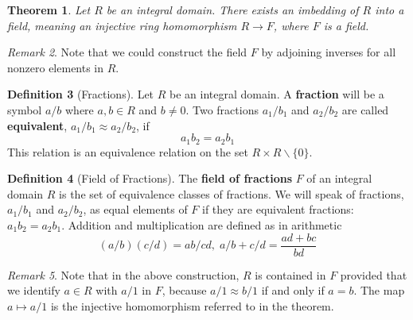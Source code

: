 \documentclass[12pt]{article}
\newtheorem{thm}{Theorem}[section]
\theoremstyle{definition}
\newtheorem{defn}[thm]{Definition}
\theoremstyle{remark}
\newtheorem{rmk}[thm]{Remark}
\numberwithin{equation}{section}
\newcommand\B[1]{\textbf{ #1}}
\begin{document}
\vspace{15pt}


\begin{thm}
        Let $R$ be an integral domain. There exists an imbedding of $R$ into a field, meaning an injective ring homomorphism $R\rightarrow F$, where $F$ is a field.
\end{thm}

\vspace{15pt}


\begin{rmk}
        Note that we could construct the field $F$ by adjoining inverses for all nonzero elements in $R$.
\end{rmk}

\vspace{15pt}

\begin{defn}[Fractions]
        Let $R$ be an integral domain. A \B{fraction} will be a symbol $a/b$ where $a,b \in R$ and $b \neq 0$. Two fractions $a_1/b_1$ and $a_2/b_2$ are called \B{equivalent}, $a_1/b_1 \approx a_2/b_2$, if \begin{equation}
                a_1b_2 = a_2b_1
        \end{equation}
        This relation is an equivalence relation on the set $R\times R\backslash\{0\}$. 
\end{defn}

\vspace{15pt}

\begin{defn}[Field of Fractions]
        The \B{field of fractions} $F$ of an integral domain $R$ is the set of equivalence classes of fractions. We will speak of fractions, $a_1/b_1$ and $a_2/b_2$, as equal elements of $F$ if they are equivalent fractions: $a_1b_2 = a_2b_1$. Addition and multiplication are defined as in arithmetic \begin{equation}
                (a/b)(c/d) = ab/cd,\;a/b+c/d = \frac{ad+bc}{bd}
        \end{equation}
\end{defn}

\vspace{15pt}

\begin{rmk}
        Note that in the above construction, $R$ is contained in $F$ provided that we identify $a \in R$ with $a/1$ in $F$, because $a/1 \approx b/1$ if and only if $a = b$. The map $a \mapsto a/1$ is the injective homomorphism referred to in the theorem.
\end{rmk}
\end{document}
